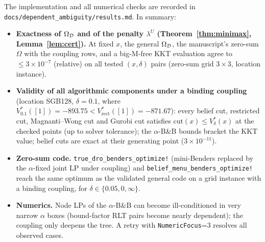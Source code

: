 The implementation and all numerical checks are recorded in \texttt{docs/dependent\_ambiguity/results.md}. In summary:
\begin{itemize}[nosep]
\item \textbf{Exactness of $\Omega_{\mathcal{D}}$ and of the penalty $\lambda^U$ (Theorem~\ref{thm:minimax}, Lemma~\ref{lem:cert}).} At fixed $x$, the general $\Omega_{\mathcal{D}}$, the manuscript's zero-sum $\Omega$ with the coupling rows, and a big-M-free KKT evaluation agree to $\le 3\times10^{-7}$ (relative) on all tested $(x,\delta)$ pairs (zero-sum grid $3\times3$, location instance).
\item \textbf{Validity of all algorithmic components under a binding coupling} (location SGB128, $\delta=0.1$, where $V^*_{0.1}([1])=-893.75<V^*_{\mathrm{rect}}([1])=-871.67$): every belief cut, restricted cut, Magnanti--Wong cut and Gurobi cut satisfies $\mathrm{cut}(x)\le V^*_\delta(x)$ at the checked points (up to solver tolerance); the $\alpha$-B\&B bounds bracket the KKT value; belief cuts are exact at their generating point ($3\times10^{-11}$).
\item \textbf{Zero-sum code.} \texttt{true\_dro\_benders\_optimize!} (mini-Benders replaced by the $\alpha$-fixed joint LP under coupling) and \texttt{belief\_menu\_benders\_optimize!} reach the same optimum as the validated general code on a grid instance with a binding coupling, for $\delta\in\{0.05,0,\infty\}$.
\item \textbf{Numerics.} Node LPs of the $\alpha$-B\&B can become ill-conditioned in very narrow $\alpha$ boxes (bound-factor RLT pairs become nearly dependent); the coupling only deepens the tree. A retry with \texttt{NumericFocus}=3 resolves all observed cases.
\end{itemize}
